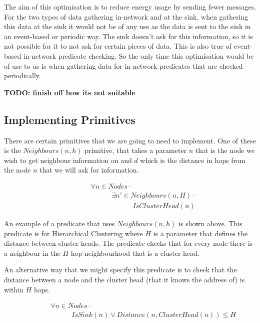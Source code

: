The aim of this optimisation is to reduce energy usage by sending fewer messages. For the two types of data gathering in-network and at the sink, when gathering this data at the sink it would not be of any use as the data is sent to the sink in an event-based or periodic way. The sink doesn't ask for this information, so it is not possible for it to not ask for certain pieces of data. This is also true of event-based in-network predicate checking. So the only time this optimisation would be of use to us is when gathering data for in-network predicates that are checked periodically.

\textbf{TODO: finish off how its not suitable}


\subsection{Implementing Primitives}

There are certain primitives that we are going to need to implement. One of these is the $Neighbours(n, h)$ primitive, that takes a parameter $n$ that is the node we wish to get neighbour information on and $d$ which is the distance in hops from the node $n$ that we will ask for information.

\begin{align}
\label{eq:hcluster-neighbours-predicate}
& \hspace{3em}	\forall n \in Nodes \cdot \\
& \hspace{6em}		\exists n' \in Neighbours(n, H) \cdot \\
& \hspace{9em}			IsClusterHead(n)
\end{align}

An example of a predicate that uses $Neighbours(n, h)$ is shown above. This predicate is for Hierarchical Clustering where $H$ is a parameter that defines the distance between cluster heads. The predicate checks that for every node there is a neighbour in the $H$-hop neighbourhood that is a cluster head.

An alternative way that we might specify this predicate is to check that the distance between a node and the cluster head (that it knows the address of) is within $H$ hops.

\begin{align}
\label{eq:hcluster-distance-predicate}
& \hspace{3em}	\forall n \in Nodes \cdot \\
& \hspace{6em}		IsSink(n) \lor Distance(n, ClusterHead(n)) \leq H
\end{align}

